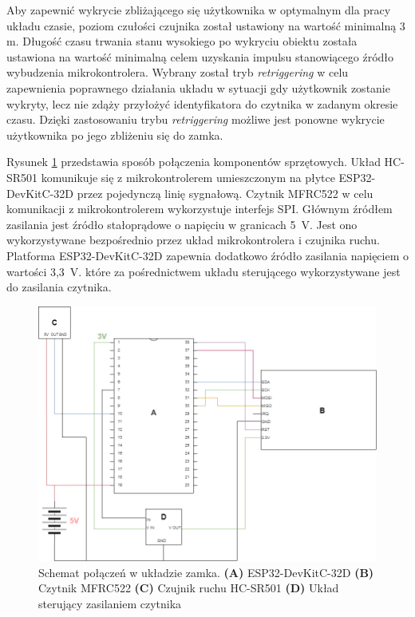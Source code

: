             Aby zapewnić wykrycie zbliżającego się użytkownika w optymalnym dla pracy układu czasie, poziom czułości czujnika został ustawiony na wartość minimalną 3 m. Długość czasu trwania stanu wysokiego po wykryciu obiektu została ustawiona na wartość minimalną celem uzyskania impulsu stanowiącego źródło wybudzenia mikrokontrolera. Wybrany został tryb \textit{retriggering} w celu zapewnienia poprawnego działania układu w sytuacji gdy użytkownik zostanie wykryty, lecz nie zdąży przyłożyć identyfikatora do czytnika w zadanym okresie czasu. Dzięki zastosowaniu trybu \textit{retriggering} możliwe jest ponowne wykrycie użytkownika po jego zbliżeniu się do zamka.


            Rysunek \ref{fig:lock_hardware_schematic} przedstawia sposób połączenia komponentów sprzętowych. Układ HC-SR501 komunikuje się z mikrokontrolerem umieszczonym na płytce ESP32-DevKitC-32D przez pojedynczą linię sygnałową. Czytnik MFRC522 w celu komunikacji z mikrokontrolerem wykorzystuje interfejs SPI. Głównym źródłem zasilania jest źródło stałoprądowe o napięciu w granicach 5~V. Jest ono wykorzystywane bezpośrednio przez układ mikrokontrolera i czujnika ruchu. Platforma ESP32-DevKitC-32D zapewnia dodatkowo źródło zasilania napięciem o wartości 3,3~V. które za pośrednictwem układu sterującego wykorzystywane jest do zasilania czytnika.

            \begin{figure}[]
                \centering
                \includegraphics[width=\textwidth]{chapters/images/lock_hardware_schematic.png}
                \caption[Schemat połączeń w układzie zamka] {
                    Schemat połączeń w układzie zamka.
                    \textbf{(A)} ESP32-DevKitC-32D
                    \textbf{(B)} Czytnik MFRC522
                    \textbf{(C)} Czujnik ruchu HC-SR501
                    \textbf{(D)} Układ sterujący zasilaniem czytnika
                }
                \label{fig:lock_hardware_schematic}
            \end{figure}

